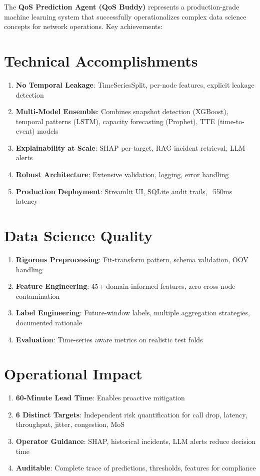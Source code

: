\documentclass[11pt,a4paper,oneside]{report}
\begin{document}
The \textbf{QoS Prediction Agent (QoS Buddy)} represents a production-grade machine learning system that successfully operationalizes complex data science concepts for network operations. Key achievements:

\section{Technical Accomplishments}

\begin{enumerate}
    \item \textbf{No Temporal Leakage}: TimeSeriesSplit, per-node features, explicit leakage detection
    \item \textbf{Multi-Model Ensemble}: Combines snapshot detection (XGBoost), temporal patterns (LSTM), capacity forecasting (Prophet), TTE (time-to-event) models
    \item \textbf{Explainability at Scale}: SHAP per-target, RAG incident retrieval, LLM alerts
    \item \textbf{Robust Architecture}: Extensive validation, logging, error handling
    \item \textbf{Production Deployment}: Streamlit UI, SQLite audit trails, ~550ms latency
\end{enumerate}

\section{Data Science Quality}

\begin{enumerate}
    \item \textbf{Rigorous Preprocessing}: Fit-transform pattern, schema validation, OOV handling
    \item \textbf{Feature Engineering}: 45+ domain-informed features, zero cross-node contamination
    \item \textbf{Label Engineering}: Future-window labels, multiple aggregation strategies, documented rationale
    \item \textbf{Evaluation}: Time-series aware metrics on realistic test folds
\end{enumerate}

\section{Operational Impact}

\begin{enumerate}
    \item \textbf{60-Minute Lead Time}: Enables proactive mitigation
    \item \textbf{6 Distinct Targets}: Independent risk quantification for call drop, latency, throughput, jitter, congestion, MoS
    \item \textbf{Operator Guidance}: SHAP, historical incidents, LLM alerts reduce decision time
    \item \textbf{Auditable}: Complete trace of predictions, thresholds, features for compliance
\end{enumerate}
\end{document}

